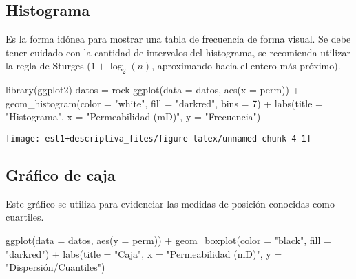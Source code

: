 \documentclass[
]{book}
\newenvironment{Shaded}{\begin{snugshade}}{\end{snugshade}}
\newcommand{\AttributeTok}[1]{\textcolor[rgb]{0.77,0.63,0.00}{#1}}
\newcommand{\DecValTok}[1]{\textcolor[rgb]{0.00,0.00,0.81}{#1}}
\newcommand{\FunctionTok}[1]{\textcolor[rgb]{0.00,0.00,0.00}{#1}}
\newcommand{\NormalTok}[1]{#1}
\newcommand{\OtherTok}[1]{\textcolor[rgb]{0.56,0.35,0.01}{#1}}
\newcommand{\SpecialCharTok}[1]{\textcolor[rgb]{0.00,0.00,0.00}{#1}}
\newcommand{\StringTok}[1]{\textcolor[rgb]{0.31,0.60,0.02}{#1}}
\theoremstyle{definition}
\theoremstyle{definition}
\theoremstyle{definition}
\theoremstyle{definition}
\theoremstyle{remark}
\begin{document}
\hypertarget{histograma}{%
\subsection*{Histograma}\label{histograma}}

Es la forma idónea para mostrar una tabla de frecuencia de forma visual. Se debe tener cuidado con la cantidad de intervalos del histograma, se recomienda utilizar la regla de Sturges (\(1+\log_2(n)\), aproximando hacia el entero más próximo).

\begin{Shaded}
\begin{Highlighting}[]
\FunctionTok{library}\NormalTok{(ggplot2)}
\NormalTok{datos }\OtherTok{=}\NormalTok{ rock}
\FunctionTok{ggplot}\NormalTok{(}\AttributeTok{data =}\NormalTok{ datos, }\FunctionTok{aes}\NormalTok{(}\AttributeTok{x =}\NormalTok{ perm)) }\SpecialCharTok{+}
  \FunctionTok{geom\_histogram}\NormalTok{(}\AttributeTok{color =} \StringTok{"white"}\NormalTok{, }\AttributeTok{fill =} \StringTok{"darkred"}\NormalTok{, }\AttributeTok{bins =} \DecValTok{7}\NormalTok{) }\SpecialCharTok{+}
  \FunctionTok{labs}\NormalTok{(}\AttributeTok{title =} \StringTok{"Histograma"}\NormalTok{, }\AttributeTok{x =} \StringTok{"Permeabilidad (mD)"}\NormalTok{, }\AttributeTok{y =} \StringTok{"Frecuencia"}\NormalTok{)}
\end{Highlighting}
\end{Shaded}

\begin{center}\texttt{[image: est1+descriptiva\_files/figure-latex/unnamed-chunk-4-1]} \end{center}

\hypertarget{gruxe1fico-de-caja}{%
\subsection*{Gráfico de caja}\label{gruxe1fico-de-caja}}

Este gráfico se utiliza para evidenciar las medidas de posición conocidas como cuartiles.

\begin{Shaded}
\begin{Highlighting}[]
\FunctionTok{ggplot}\NormalTok{(}\AttributeTok{data =}\NormalTok{ datos, }\FunctionTok{aes}\NormalTok{(}\AttributeTok{y =}\NormalTok{ perm)) }\SpecialCharTok{+} 
  \FunctionTok{geom\_boxplot}\NormalTok{(}\AttributeTok{color =} \StringTok{"black"}\NormalTok{, }\AttributeTok{fill =} \StringTok{"darkred"}\NormalTok{) }\SpecialCharTok{+}
  \FunctionTok{labs}\NormalTok{(}\AttributeTok{title =} \StringTok{"Caja"}\NormalTok{, }\AttributeTok{x =} \StringTok{"Permeabilidad (mD)"}\NormalTok{, }\AttributeTok{y =} \StringTok{"Dispersión/Cuantiles"}\NormalTok{) }
\end{Highlighting}
\end{Shaded}
\end{document}
